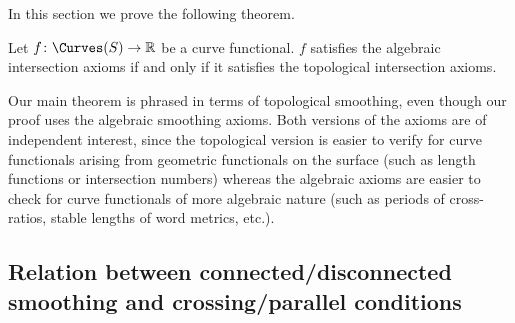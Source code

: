 In this section we prove the following theorem.

\begin{theorem}
Let $f \colon \Curves(S) \to \mathbb{R}$ be a curve functional. $f$ satisfies the algebraic intersection axioms if and only if it satisfies the topological intersection axioms.
\end{theorem}

 Our main theorem is phrased in terms of topological smoothing, even though our proof uses the algebraic smoothing axioms. Both versions of the axioms are of independent interest, since the topological version is easier to verify for curve functionals arising from geometric functionals on the surface (such as length functions or intersection numbers) whereas the algebraic axioms are easier to check for curve functionals of more algebraic nature (such as periods of cross-ratios, stable lengths of word metrics, etc.).


\subsection{Relation between connected/disconnected smoothing and crossing/parallel conditions} 



